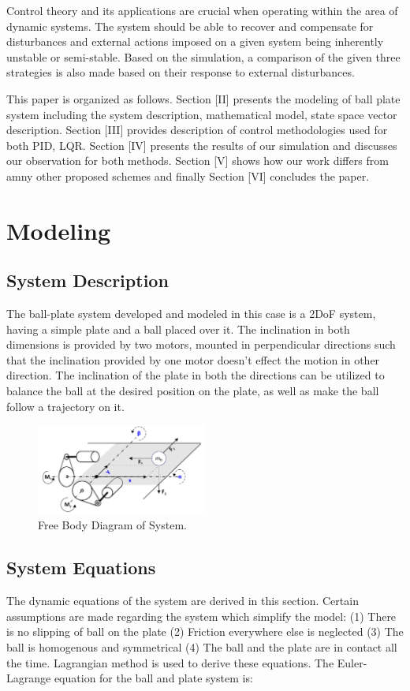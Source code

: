 \documentclass[conference]{IEEEtran}
\begin{document}
Control theory and its applications are crucial when operating within the area of dynamic systems. The system should be able to recover and compensate for disturbances and external actions imposed on a given system being inherently unstable or semi-stable. Based on the simulation, a comparison of the given three strategies is also made based on their response to external disturbances. 

This paper is organized as follows. Section [II] presents the modeling of ball plate system including the system description, mathematical model, state space vector description. Section [III] provides description of control methodologies used for both PID, LQR. Section [IV] presents the results of our simulation and discusses our observation for both methods. Section [V] shows how our work differs from amny other proposed schemes and finally Section [VI] concludes the paper.




\section{Modeling}

\subsection{System Description}

The ball-plate system developed and modeled in this case is a 2DoF system, having a simple plate and a ball placed over it. The inclination in both dimensions is provided by two motors, mounted in perpendicular directions such that the inclination provided by one motor doesn’t effect the motion in other direction. The inclination of the plate in both the directions can be utilized to balance the ball at the desired position on the plate, as well as make the ball follow a trajectory on it.
\begin{figure}[htbp]
\centerline{\includegraphics[width=0.5\textwidth]{FBD.png}}
\caption{Free Body Diagram of System.}
\label{fig1}
\end{figure}

\subsection{System Equations}
The dynamic equations of the system are derived in this section. Certain assumptions are made regarding the system which simplify the model: (1) There is no slipping of ball on the plate (2) Friction everywhere else is neglected (3) The ball is homogenous and symmetrical (4) The ball and the plate are in contact all the time. Lagrangian method is used to derive these equations. The Euler-Lagrange equation for the ball and plate system is: 
\end{document}

